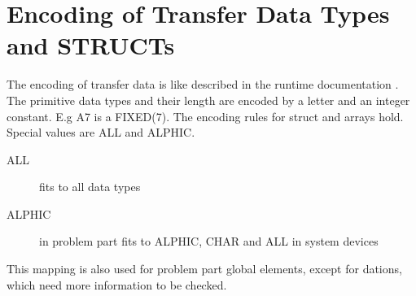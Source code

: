 \section{Encoding of Transfer Data Types and STRUCTs}
\label{encoding}
The encoding of transfer data is like described in the runtime documentation
\cite{runtime}. The primitive data types and their length are encoded 
by a letter and an integer constant. E.g A7 is a FIXED(7). The encoding rules
for struct and arrays hold. Special values are ALL and ALPHIC.

\begin{description}
\item[ALL] fits to all data types
\item[ALPHIC] in problem part fits to ALPHIC, CHAR and ALL in system devices
\end{description}

This mapping is also used for problem part global elements, except for dations,
which need more information to be checked.
